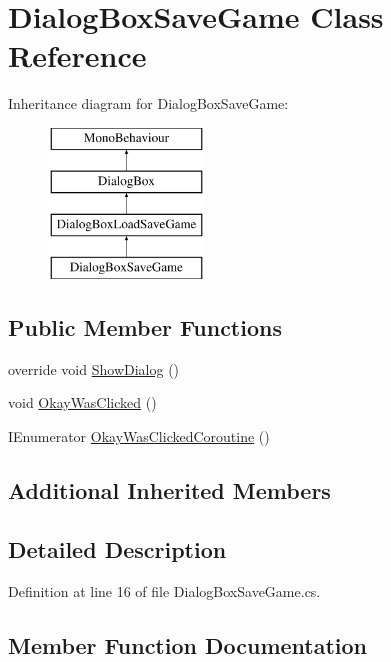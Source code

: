 \hypertarget{class_dialog_box_save_game}{}\section{Dialog\+Box\+Save\+Game Class Reference}
\label{class_dialog_box_save_game}
Inheritance diagram for Dialog\+Box\+Save\+Game\+:\begin{figure}[H]
\begin{center}
\leavevmode
\includegraphics[height=4.000000cm]{class_dialog_box_save_game}
\end{center}
\end{figure}
\subsection*{Public Member Functions}
\begin{DoxyCompactItemize}
\item 
override void \hyperlink{class_dialog_box_save_game_a83ed557d75cb749de3b8e3a6b60e1c3d}{Show\+Dialog} ()
\item 
void \hyperlink{class_dialog_box_save_game_a9a2d78d9ba7dafaff12c279604c3ada1}{Okay\+Was\+Clicked} ()
\item 
I\+Enumerator \hyperlink{class_dialog_box_save_game_a60b4df4890e0db361d5a01200b3824de}{Okay\+Was\+Clicked\+Coroutine} ()
\end{DoxyCompactItemize}
\subsection*{Additional Inherited Members}


\subsection{Detailed Description}


Definition at line 16 of file Dialog\+Box\+Save\+Game.\+cs.



\subsection{Member Function Documentation}
\mbox{\label{class_dialog_box_save_game_a9a2d78d9ba7dafaff12c279604c3ada1}} 

